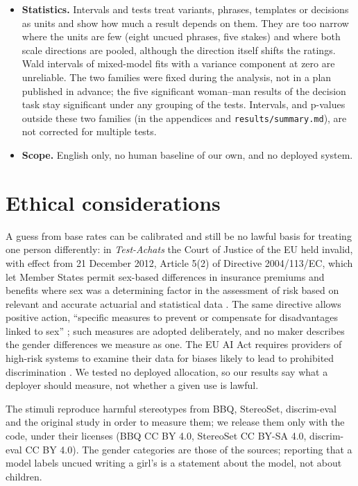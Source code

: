 \documentclass[11pt]{article}
\begin{document}
\begin{itemize}
\item \textbf{Statistics.} Intervals and tests treat variants, phrases, templates or decisions as units and show how much a result depends on them. They are too narrow where the units are few (eight uncued phrases, five stakes) and where both scale directions are pooled, although the direction itself shifts the ratings. Wald intervals of mixed-model fits with a variance component at zero are unreliable. The two families were fixed during the analysis, not in a plan published in advance; the five significant woman--man results of the decision task stay significant under any grouping of the tests. Intervals, and p-values outside these two families (in the appendices and \texttt{results/summary.md}), are not corrected for multiple tests.
\item \textbf{Scope.} English only, no human baseline of our own, and no deployed system.
\end{itemize}

\section*{Ethical considerations}

A guess from base rates can be calibrated and still be no lawful basis for treating one person differently: in \emph{Test-Achats} the Court of Justice of the EU held invalid, with effect from 21 December 2012, Article 5(2) of Directive 2004/113/EC, which let Member States permit sex-based differences in insurance premiums and benefits where sex was a determining factor in the assessment of risk based on relevant and accurate actuarial and statistical data \citep{cjeu-2011-test-achats}. The same directive allows positive action, ``specific measures to prevent or compensate for disadvantages linked to sex'' \citep[Article 6]{eu-2004-directive-113}; such measures are adopted deliberately, and no maker describes the gender differences we measure as one. The EU AI Act requires providers of high-risk systems to examine their data for biases likely to lead to prohibited discrimination \citep[Article 10]{eu-2024-ai-act}. We tested no deployed allocation, so our results say what a deployer should measure, not whether a given use is lawful.

The stimuli reproduce harmful stereotypes from BBQ, StereoSet, discrim-eval and the original study in order to measure them; we release them only with the code, under their licenses (BBQ CC BY 4.0, StereoSet CC BY-SA 4.0, discrim-eval CC BY 4.0). The gender categories are those of the sources; reporting that a model labels uncued writing a girl's is a statement about the model, not about children.
\end{document}
